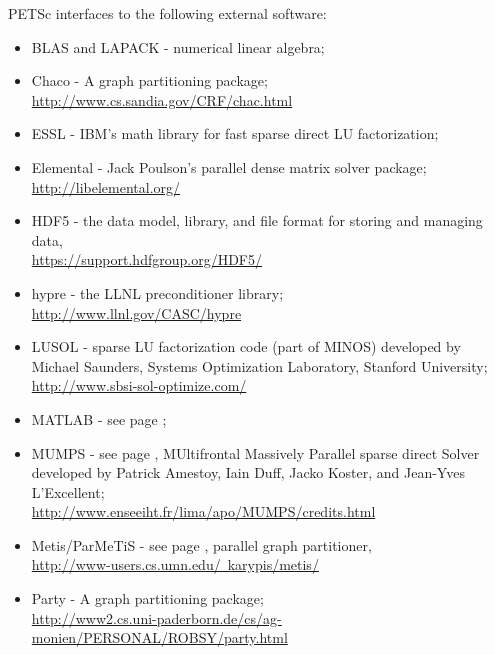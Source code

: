 \vspace{.3in}
\noindent
PETSc interfaces to the following external software:
\begin{itemize}
  \item BLAS and LAPACK - numerical linear algebra;
  \item Chaco - A graph partitioning package;\\\href{http://www.cs.sandia.gov/CRF/chac.html}{http://www.cs.sandia.gov/CRF/chac.html}
  \item ESSL -         IBM's math library for fast sparse direct LU factorization;
  \item Elemental -  Jack Poulson's parallel dense matrix solver package;\\\href{http://libelemental.org/}{http://libelemental.org/}
  \item HDF5 - the data model, library, and file format for storing and managing data,\\\href{https://support.hdfgroup.org/HDF5/}{https://support.hdfgroup.org/HDF5/}
  \item hypre -    the LLNL preconditioner library;\\\href{http://www.llnl.gov/CASC/hypre}{http://www.llnl.gov/CASC/hypre}
  \item LUSOL -       sparse LU factorization code (part of MINOS) developed by Michael Saunders,
                      Systems Optimization Laboratory, Stanford University;\\
                     \href{http://www.sbsi-sol-optimize.com/}{http://www.sbsi-sol-optimize.com/}
  \item MATLAB -      see page \pageref{ch_matlab};
  \item MUMPS -      see page \pageref{sec_externalsol}, MUltifrontal Massively Parallel sparse direct Solver developed by Patrick Amestoy,
                     Iain Duff, Jacko Koster, and Jean-Yves L'Excellent; \\
                     \href{http://www.enseeiht.fr/lima/apo/MUMPS/credits.html}{http://www.enseeiht.fr/lima/apo/MUMPS/credits.html}
  \item Metis/ParMeTiS - see page \pageref{sec_partitioning}, parallel graph partitioner,\\
                     \href{http://www-users.cs.umn.edu/~karypis/metis/}{http://www-users.cs.umn.edu/~karypis/metis/}
  \item Party -     A graph partitioning package; \\ 
               \href{http://www2.cs.uni-paderborn.de/cs/ag-monien/PERSONAL/ROBSY/party.html}{http://www2.cs.uni-paderborn.de/cs/ag-monien/PERSONAL/ROBSY/party.html}

\end{itemize}
